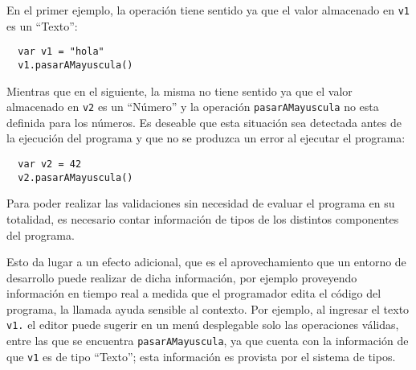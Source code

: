 \documentclass[a4paper,10pt]{article}
\begin{document}

En el primer ejemplo, la operación tiene sentido ya que el valor almacenado en \verb|v1| es un ``Texto'':

\begin{verbatim}
  var v1 = "hola"
  v1.pasarAMayuscula()
\end{verbatim}

Mientras que en el siguiente, la misma no tiene sentido ya que el valor almacenado en \verb|v2| es un ``Número'' y la operación \verb|pasarAMayuscula| no esta definida para los números. Es deseable que esta situación sea detectada antes de la ejecución del programa y que no se produzca un error al ejecutar el programa:

\begin{verbatim}
  var v2 = 42
  v2.pasarAMayuscula()
\end{verbatim}

Para poder realizar las validaciones sin necesidad de evaluar el programa en su totalidad, es necesario contar información de tipos de los distintos componentes del programa.

Esto da lugar a un efecto adicional, que es el aprovechamiento que un entorno de desarrollo\cite{haber86a} puede realizar de dicha información, 
por ejemplo proveyendo información en tiempo real a medida que el programador edita el código del programa, la llamada ayuda sensible al contexto\cite{haber86a}. Por ejemplo, al ingresar el texto \verb|v1.| el editor puede sugerir en un menú desplegable solo las operaciones válidas, entre las que se encuentra \verb|pasarAMayuscula|, ya que cuenta con la información de que \verb|v1| es de tipo ``Texto''; esta información es provista por el sistema de tipos.

\end{document}
